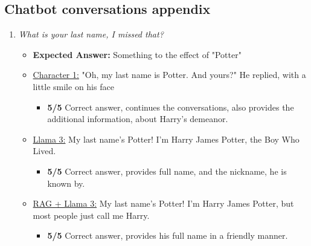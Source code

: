 \documentclass[fleqn,moreauthors,10pt]{ds_report}
\begin{document}
\begin{appendices}
    \section{Chatbot conversations appendix}

        \begin{enumerate}
            \item  \textit{What is your last name, I missed that?}
            \begin{itemize}
                \item \textbf{Expected Answer:} Something to the effect of "Potter"
                \item \underline{Character 1:} "Oh, my last name is Potter. And yours?" He replied, with a little smile on his face
                \begin{itemize}
                    \item \textbf{5/5} Correct answer, continues the conversations, also provides the additional information, about Harry's demeanor.
                \end{itemize}        
                \item \underline{Llama 3:} My last name's Potter! I'm Harry James Potter, the Boy Who Lived.
                \begin{itemize}
                    \item \textbf{5/5} Correct answer, provides full name, and the nickname, he is known by.
                \end{itemize}
                \item \underline{RAG + Llama 3:} My last name's Potter! I'm Harry James Potter, but most people just call me Harry.
                \begin{itemize}
                    \item \textbf{5/5} Correct answer, provides his full name in a friendly manner.
                \end{itemize}
            \end{itemize}
        

\end{enumerate}
\end{appendices}
\end{document}
